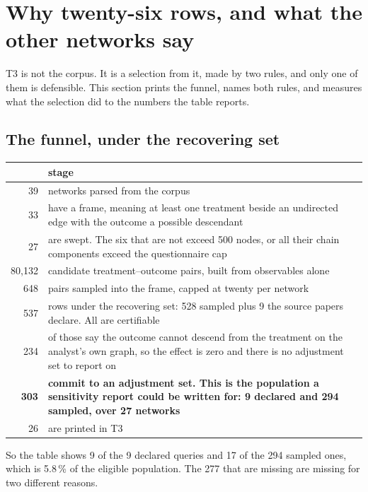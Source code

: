 \clearpage
\section{Why twenty-six rows, and what the other networks say}

T3 is not the corpus. It is a selection from it, made by two rules, and only one of them is
defensible. This section prints the funnel, names both rules, and measures what the selection did
to the numbers the table reports.

\subsection{The funnel, under the recovering set}

\begin{center}\small
\begin{tabular}{@{}rp{11.9cm}@{}}
\toprule
& stage \\
\midrule
39 & networks parsed from the corpus \\
33 & have a frame, meaning at least one treatment beside an undirected edge with the outcome a
possible descendant \\
27 & are swept. The six that are not exceed 500 nodes, or all their chain components exceed the
questionnaire cap \\
80{,}132 & candidate treatment--outcome pairs, built from observables alone \\
648 & pairs sampled into the frame, capped at twenty per network \\
537 & rows under the recovering set: 528 sampled plus 9 the source papers declare. All are
certifiable \\
234 & of those say the outcome cannot descend from the treatment on the analyst's own graph, so
the effect is zero and there is no adjustment set to report on \\
\textbf{303} & \textbf{commit to an adjustment set. This is the population a sensitivity report
could be written for: 9 declared and 294 sampled, over 27 networks} \\
\midrule
26 & are printed in T3 \\
\bottomrule
\end{tabular}
\end{center}

So the table shows 9 of the 9 declared queries and 17 of the 294 sampled ones, which is 5.8\,\% of
the eligible population. The 277 that are missing are missing for two different reasons.

